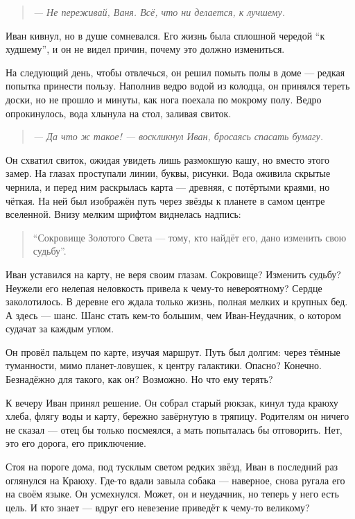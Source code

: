 \documentclass[12pt,a4paper]{book}
\newenvironment{dialogue}{\begin{quote}\itshape}{\end{quote}}
\begin{document}
\begin{dialogue}
--- Не переживай, Ваня. Всё, что ни делается, к лучшему.
\end{dialogue}

Иван кивнул, но в душе сомневался. Его жизнь была сплошной чередой ``к худшему'', и он не видел причин, почему это должно измениться.

На следующий день, чтобы отвлечься, он решил помыть полы в доме --- редкая попытка принести пользу. Наполнив ведро водой из колодца, он принялся тереть доски, но не прошло и минуты, как нога поехала по мокрому полу. Ведро опрокинулось, вода хлынула на стол, заливая свиток.

\begin{dialogue}
--- Да что ж такое! --- воскликнул Иван, бросаясь спасать бумагу.
\end{dialogue}

Он схватил свиток, ожидая увидеть лишь размокшую кашу, но вместо этого замер. На глазах проступали линии, буквы, рисунки. Вода оживила скрытые чернила, и перед ним раскрылась карта --- древняя, с потёртыми краями, но чёткая. На ней был изображён путь через звёзды к планете в самом центре вселенной. Внизу мелким шрифтом виднелась надпись:

\begin{quote}
``Сокровище Золотого Света --- тому, кто найдёт его, дано изменить свою судьбу''.
\end{quote}

Иван уставился на карту, не веря своим глазам. Сокровище? Изменить судьбу? Неужели его нелепая неловкость привела к чему-то невероятному? Сердце заколотилось. В деревне его ждала только жизнь, полная мелких и крупных бед. А здесь --- шанс. Шанс стать кем-то большим, чем Иван-Неудачник, о котором судачат за каждым углом.

Он провёл пальцем по карте, изучая маршрут. Путь был долгим: через тёмные туманности, мимо планет-ловушек, к центру галактики. Опасно? Конечно. Безнадёжно для такого, как он? Возможно. Но что ему терять?

К вечеру Иван принял решение. Он собрал старый рюкзак, кинул туда краюху хлеба, флягу воды и карту, бережно завёрнутую в тряпицу. Родителям он ничего не сказал --- отец бы только посмеялся, а мать попыталась бы отговорить. Нет, это его дорога, его приключение.

Стоя на пороге дома, под тусклым светом редких звёзд, Иван в последний раз оглянулся на Краюху. Где-то вдали завыла собака --- наверное, снова ругала его на своём языке. Он усмехнулся. Может, он и неудачник, но теперь у него есть цель. И кто знает --- вдруг его невезение приведёт к чему-то великому?
\end{document}
